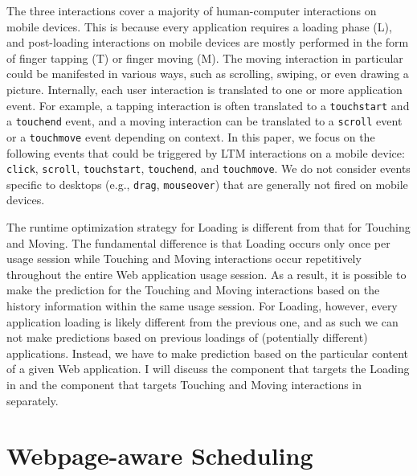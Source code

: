 The three interactions cover a majority of human-computer interactions on mobile devices. This is because every application requires a loading phase (L), and post-loading interactions on mobile devices are mostly performed in the form of finger tapping (T) or finger moving (M). The moving interaction in particular could be manifested in various ways, such as scrolling, swiping, or even drawing a picture. Internally, each user interaction is translated to one or more application event. For example, a tapping interaction is often translated to a \texttt{touchstart} and a \texttt{touchend} event, and a moving interaction can be translated to a \texttt{scroll} event or a \texttt{touchmove} event depending on context. In this paper, we focus on the following events that could be triggered by LTM interactions on a mobile device: \texttt{click}, \texttt{scroll}, \texttt{touchstart}, \texttt{touchend}, and \texttt{touchmove}. We do not consider events specific to desktops (e.g., \texttt{drag}, \texttt{mouseover}) that are generally not fired on mobile devices.


The runtime optimization strategy for Loading is different from that for Touching and Moving. The fundamental difference is that Loading occurs only once per usage session while Touching and Moving interactions occur repetitively throughout the entire Web application usage session. As a result, it is possible to make the prediction for the Touching and Moving interactions based on the history information within the same usage session. For Loading, however, every application loading is likely different from the previous one, and as such we can not make predictions based on previous loadings of (potentially different) applications. Instead, we have to make prediction based on the particular content of a given Web application. I will discuss the \webrt component that targets the Loading in  and the component that targets Touching and Moving interactions in  separately.

\section{Webpage-aware Scheduling}
\label{sec:runtime:load}

